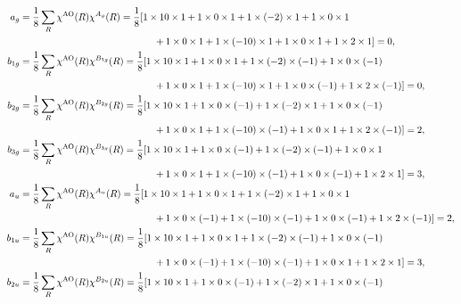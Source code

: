 \documentclass[a4paper]{book}
\newcommand{\AO}{{\rm AO}}
\begin{document}
\begin{solution}
\begin{enumerate}[label=(\alph*)]
		\begin{align*}
			a_g &= \frac{1}{8} \sum_{R} \chi^{\AO}(R) \chi^{A_g}(R) = \frac{1}{8} [ 1 \times 10 \times 1 + 1 \times 0 \times 1 + 1 \times (-2) \times 1 + 1 \times 0 \times 1 \\
		 	&\hspace{14em}+ 1 \times 0 \times 1 + 1 \times (-10) \times 1 + 1 \times 0 \times 1 + 1 \times 2 \times 1 ] = 0,	\\
		 	b_{1g} &= \frac{1}{8} \sum_{R} \chi^{\AO}(R) \chi^{B_{1g}}(R) = \frac{1}{8} [ 1 \times 10 \times 1 + 1 \times 0 \times 1 + 1 \times (-2) \times (-1) + 1 \times 0 \times (-1) \\
		 	&\hspace{14em}+ 1 \times 0 \times 1 + 1 \times (-10) \times 1 + 1 \times 0 \times (-1) + 1 \times 2 \times (-1) ] = 0,	\\
		 	b_{2g} &= \frac{1}{8} \sum_{R} \chi^{\AO}(R) \chi^{B_{2g}}(R) = \frac{1}{8} [ 1 \times 10 \times 1 + 1 \times 0 \times (-1) + 1 \times (-2) \times 1 + 1 \times 0 \times (-1) \\
		 	&\hspace{14em}+ 1 \times 0 \times 1 + 1 \times (-10) \times (-1) + 1 \times 0 \times 1 + 1 \times 2 \times (-1) ] = 2,	\\
		 	b_{3g} &= \frac{1}{8} \sum_{R} \chi^{\AO}(R) \chi^{B_{3g}}(R) = \frac{1}{8} [ 1 \times 10 \times 1 + 1 \times 0 \times (-1) + 1 \times (-2) \times (-1) + 1 \times 0 \times 1 \\
		 	&\hspace{14em}+ 1 \times 0 \times 1 + 1 \times (-10) \times (-1) + 1 \times 0 \times (-1) + 1 \times 2 \times 1 ] = 3,	\\
		 	a_u &= \frac{1}{8} \sum_{R} \chi^{\AO}(R) \chi^{A_u}(R) = \frac{1}{8} [ 1 \times 10 \times 1 + 1 \times 0 \times 1 + 1 \times (-2) \times 1 + 1 \times 0 \times 1 \\
		 	&\hspace{14em}+ 1 \times 0 \times (-1) + 1 \times (-10) \times (-1) + 1 \times 0 \times (-1) + 1 \times 2 \times (-1) ] = 2,	\\
		 	b_{1u} &= \frac{1}{8} \sum_{R} \chi^{\AO}(R) \chi^{B_{1u}}(R) = \frac{1}{8} [ 1 \times 10 \times 1 + 1 \times 0 \times 1 + 1 \times (-2) \times (-1) + 1 \times 0 \times (-1) \\
		 	&\hspace{14em}+ 1 \times 0 \times (-1) + 1 \times (-10) \times (-1) + 1 \times 0 \times 1 + 1 \times 2 \times 1 ] = 3,	\\
		 	b_{2u} &= \frac{1}{8} \sum_{R} \chi^{\AO}(R) \chi^{B_{2u}}(R) = \frac{1}{8} [ 1 \times 10 \times 1 + 1 \times 0 \times (-1) + 1 \times (-2) \times 1 + 1 \times 0 \times (-1) \\

\end{align*}
\end{enumerate}
\end{solution}
\end{document}
